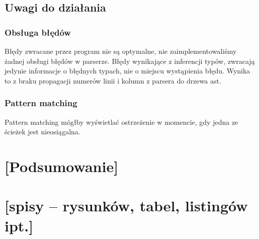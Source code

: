 \documentclass{article}
\begin{document}
\subsection{Uwagi do działania}
\subsubsection{Obsługa błędów}
Błędy zwracane przez program nie są optymalne, nie zaimplementowaliśmy żadnej obsługi błędów w parserze. Błędy wynikające z inferencji typów, zwracają jedynie informacje o błędnych typach, nie o miejscu wystąpienia błędu. Wynika to z braku propagacji numerów linii i kolumn z parsera do drzewa ast.
\subsubsection{Pattern matching}
Pattern matching mógłby wyświetlać ostrzeżenie w momencie, gdy jedna ze ścieżek jest nieosiągalna.
\section{[Podsumowanie]}
\section{[spisy -- rysunków, tabel, listingów ipt.]}




\end{document}
